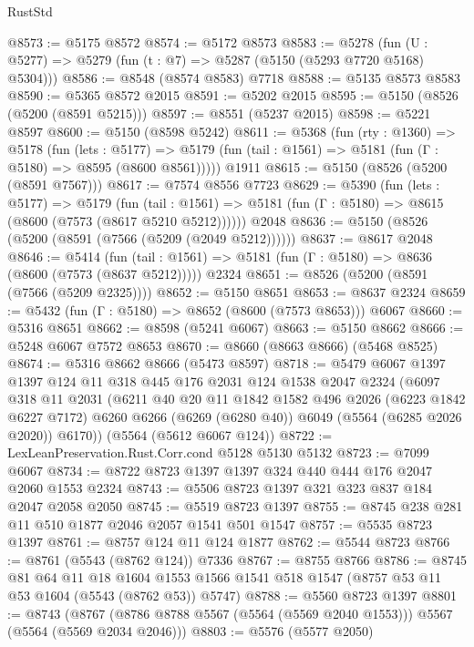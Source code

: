 \begin{lexlean}{RustStd}
\begin{coremodule}
@8573 := @5175 @8572
@8574 := @5172 @8573
@8583 := @5278 (fun (U : @5277) => @5279 (fun (t : @7) => @5287 (@5150 (@5293 @7720 @5168) @5304)))
@8586 := @8548 (@8574 @8583) @7718
@8588 := @5135 @8573 @8583
@8590 := @5365 @8572 @2015
@8591 := @5202 @2015
@8595 := @5150 (@8526 (@5200 (@8591 @5215)))
@8597 := @8551 (@5237 @2015)
@8598 := @5221 @8597
@8600 := @5150 (@8598 @5242)
@8611 := @5368
    (fun (rty : @1360) =>
    @5178
      (fun (lets : @5177) =>
      @5179 (fun (tail : @1561) => @5181 (fun (Γ : @5180) => @8595 (@8600 @8561)))))
    @1911
@8615 := @5150 (@8526 (@5200 (@8591 @7567)))
@8617 := @7574 @8556 @7723
@8629 := @5390
    (fun (lets : @5177) =>
    @5179
      (fun (tail : @1561) => @5181 (fun (Γ : @5180) => @8615 (@8600 (@7573 (@8617 @5210 @5212))))))
    @2048
@8636 := @5150 (@8526 (@5200 (@8591 (@7566 (@5209 (@2049 @5212))))))
@8637 := @8617 @2048
@8646 := @5414
    (fun (tail : @1561) => @5181 (fun (Γ : @5180) => @8636 (@8600 (@7573 (@8637 @5212)))))
    @2324
@8651 := @8526 (@5200 (@8591 (@7566 (@5209 @2325))))
@8652 := @5150 @8651
@8653 := @8637 @2324
@8659 := @5432 (fun (Γ : @5180) => @8652 (@8600 (@7573 @8653))) @6067
@8660 := @5316 @8651
@8662 := @8598 (@5241 @6067)
@8663 := @5150 @8662
@8666 := @5248 @6067 @7572 @8653
@8670 := @8660 (@8663 @8666) (@5468 @8525)
@8674 := @5316 @8662 @8666 (@5473 @8597)
@8718 := @5479
    @6067
    @1397
    @1397
    @124
    @11
    @318
    @445
    @176
    @2031
    @124
    @1538
    @2047
    @2324
    (@6097
      @318
      @11
      @2031
      (@6211
        @40
        @20
        @11
        @1842
        @1582
        @496
        @2026
        (@6223 @1842 @6227 @7172)
        @6260
        @6266
        (@6269 (@6280 @40))
        @6049
        (@5564 (@6285 @2026 @2020))
        @6170))
    (@5564 (@5612 @6067 @124))
@8722 := LexLeanPreservation.Rust.Corr.cond @5128 @5130 @5132
@8723 := @7099 @6067
@8734 := @8722 @8723 @1397 @1397 @324 @440 @444 @176 @2047 @2060 @1553 @2324
@8743 := @5506 @8723 @1397 @321 @323 @837 @184 @2047 @2058 @2050
@8745 := @5519 @8723 @1397
@8755 := @8745 @238 @281 @11 @510 @1877 @2046 @2057 @1541 @501 @1547
@8757 := @5535 @8723 @1397
@8761 := @8757 @124 @11 @124 @1877
@8762 := @5544 @8723
@8766 := @8761 (@5543 (@8762 @124)) @7336
@8767 := @8755 @8766
@8786 := @8745
    @81
    @64
    @11
    @18
    @1604
    @1553
    @1566
    @1541
    @518
    @1547
    (@8757 @53 @11 @53 @1604 (@5543 (@8762 @53)) @5747)
@8788 := @5560 @8723 @1397
@8801 := @8743
    (@8767 (@8786 @8788 @5567 (@5564 (@5569 @2040 @1553))) @5567 (@5564 (@5569 @2034 @2046)))
@8803 := @5576 (@5577 @2050)

\end{coremodule}
\end{lexlean}
